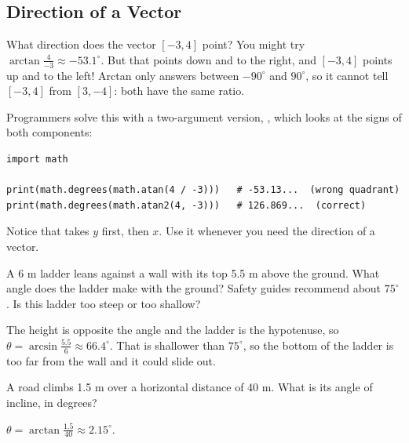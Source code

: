 \subsection{Direction of a Vector}

What direction does the vector $[-3, 4]$ point? You might try
$\arctan\frac{4}{-3} \approx -53.1^\circ$. But that points down and to the
right, and $[-3, 4]$ points up and to the left! Arctan only answers between
$-90^\circ$ and $90^\circ$, so it cannot tell $[-3, 4]$ from $[3, -4]$:
both have the same ratio.

Programmers solve this with a two-argument version, ,
which looks at the signs of both components:
\begin{verbatim}
import math

print(math.degrees(math.atan(4 / -3)))   # -53.13...  (wrong quadrant)
print(math.degrees(math.atan2(4, -3)))   # 126.869...  (correct)
\end{verbatim}
Notice that  takes $y$ first, then $x$. Use it whenever
you need the direction of a vector.

\begin{Exercise}[title={Ladder angle}, label=itrig_ladder]
A 6 m ladder leans against a wall with its top 5.5 m above the ground. What
angle does the ladder make with the ground? Safety guides recommend about
$75^\circ$. Is this ladder too steep or too shallow?
\end{Exercise}
\begin{Answer}[ref=itrig_ladder]
The height is opposite the angle and the ladder is the hypotenuse, so
$\theta = \arcsin\frac{5.5}{6} \approx 66.4^\circ$. That is shallower than
$75^\circ$, so the bottom of the ladder is too far from the wall and it
could slide out.
\end{Answer}

\begin{Exercise}[title={A steep road}, label=itrig1]
A road climbs 1.5 m over a horizontal distance of 40 m. What is its angle
of incline, in degrees?
\end{Exercise}
\begin{Answer}[ref=itrig1]
$\theta = \arctan\frac{1.5}{40} \approx 2.15^\circ$.
\end{Answer}
